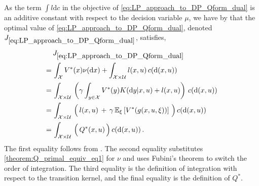 \documentclass[journal]{IEEEtran}
\newcommand{\mcal}{\mathcal}
\newcommand{\expval}[2]{\mathbb{E}_{#1}\left[#2\right]}
\newcommand{\intd}[1]{\mathrm{d}#1}
\begin{document}
\vspace{0.1cm}

\begin{IEEEproof}
	As the term $\int l \intd{c}$ in the objective of \eqref{eq:LP_approach_to_DP_Qform_dual} is an additive constant with respect to the decision variable $\mu$, we have by \cite[Theorem 6.3.7]{hernandez_2012_discreteTimeMCP} that the optimal value of \eqref{eq:LP_approach_to_DP_Qform_dual}, denoted $J_{\eqref{eq:LP_approach_to_DP_Qform_dual}}$, satisfies,
		\begin{equation} \nonumber
			\begin{aligned}
				&\, J_{\eqref{eq:LP_approach_to_DP_Qform_dual}}
				\\
				=&\, \int\nolimits_{\mcal{X}} V^\ast(x) \nu(\intd{x})
					+ \int\nolimits_{\mcal{X} \times \mcal{U}} l(x,u) \, c(\intd{(x,u)})
				\\
				=&\, \int\nolimits_{\mcal{X} \times \mcal{U}} \, \left( \gamma \int\nolimits_{y\in\mcal{X}}  V^\ast(y) K(\intd{y}|x,u) + l(x,u) \right) \, c(\intd{(x,u)})
				\\
				=&\, \int\nolimits_{\mcal{X} \times \mcal{U}} \, \Big(\, l(x,u) \,+\, \gamma \, \expval{\xi}{ V^\ast(g(x,u,\xi))} \,\Big) \, c(\intd{(x,u)})
				\\
				=&\, \int\nolimits_{\mcal{X} \times \mcal{U}} \, \Big(\, Q^\ast(x,u) \,\Big) \, c(\intd{(x,u)})
					\,.
			\end{aligned}
		\end{equation}
	The first equality follows from \cite[Theorem 6.3.7]{hernandez_2012_discreteTimeMCP}. The second equality substitutes \eqref{theorem:Q_primal_equiv_eq1} for $\nu$ and uses Fubini's theorem to switch the order of integration. The third equality is the definition of integration with respect to the transition kernel, and the final equality is the definition of $Q^\ast$.
	

\end{IEEEproof}
\end{document}
